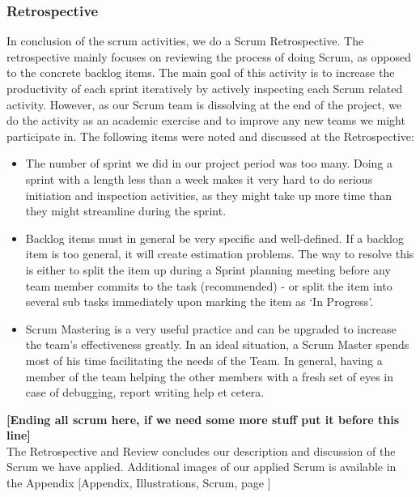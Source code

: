 \subsubsection{Retrospective}
In conclusion of the scrum activities, we do a Scrum Retrospective. The retrospective mainly focuses on reviewing the process of doing Scrum, as opposed to the concrete backlog items. The main goal of this activity is to increase the productivity of each sprint iteratively by actively inspecting each Scrum related activity. However, as our Scrum team is dissolving at the end of the project, we do the activity as an academic exercise and to improve any new teams we might participate in. The following items were noted and discussed at the Retrospective:
\begin{itemize}
\item The number of sprint we did in our project period was too many. Doing a sprint with a length less than a week makes it very hard to do serious initiation and inspection activities, as they might take up more time than they might streamline during the sprint. 
\item Backlog items must in general be very specific and well-defined. If a backlog item is too general, it will create estimation problems. The way to resolve this is either to split the item up during a Sprint planning meeting before any team member commits to the task (recommended) - or split the item into several sub tasks immediately upon marking the item as ‘In Progress’.
\item Scrum Mastering is a very useful practice and can be upgraded to increase the team’s effectiveness greatly. In an ideal situation, a Scrum Master spends most of his time facilitating the needs of the Team. In general, having a member of the team helping the other members with a fresh set of eyes in case of debugging, report writing help et cetera.
\end{itemize}
\textbf{[Ending all scrum here, if we need some more stuff put it before this line]}\\
The Retrospective and Review concludes our description and discussion of the Scrum we have applied. Additional images of our applied Scrum is available in the Appendix [Appendix, Illustrations, Scrum, page \pageref{scrumillustrations}]
\newpage